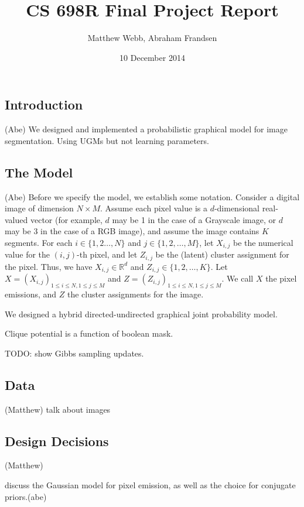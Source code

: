 \documentclass[12pt]{article}
\begin{document}
\title{CS 698R Final Project Report}
\author{Matthew Webb, Abraham Frandsen}
\date{10 December 2014}

\maketitle

\subsection*{Introduction} (Abe)
We designed and implemented a probabilistic graphical model for image segmentation.
Using UGMs but not learning parameters.


\subsection*{The Model}(Abe)
Before we specify the model, we establish some notation. 
Consider a digital image of dimension $N \times M$.
Assume each pixel value is a $d$-dimensional real-valued vector
(for example, $d$ may be 1 in the case of a Grayscale image, or $d$ may be 3 in the
case of a RGB image), and assume the image contains $K$ segments.
For each $i \in \{1,2\ldots,N\}$ and $j \in \{1,2,\ldots,M\}$,
let $X_{i,j}$ be the numerical value for the $(i,j)$-th pixel, 
and let $Z_{i,j}$ be the (latent) cluster assignment for the pixel. 
Thus, we have $X_{i,j} \in \mathbb{R}^d$ and $Z_{i,j} \in \{1,2,\ldots,K\}$. 
Let $X = (X_{i,j})_{1\leq i \leq N, 1 \leq j \leq M}$ and 
$Z=(Z_{i,j})_{1\leq i \leq N, 1 \leq j \leq M}$. We call $X$ the pixel emissions,
and $Z$ the cluster assignments for the image.

We designed a hybrid directed-undirected graphical joint probability model.

Clique potential is a function of boolean mask.

TODO: show Gibbs sampling updates. 

\subsection*{Data}(Matthew)
talk about images

\subsection*{Design Decisions}(Matthew)

discuss the Gaussian model for pixel emission, as well as the choice for conjugate priors.(abe)
\end{document}

